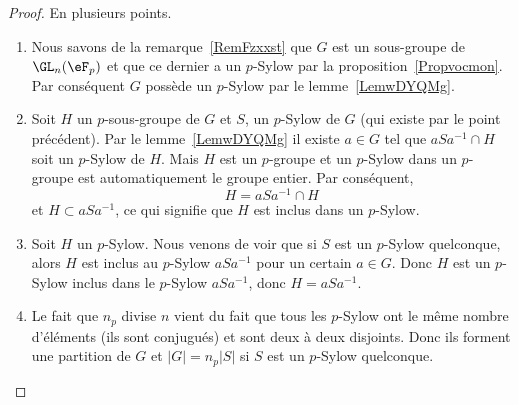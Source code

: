 \begin{proof}
	En plusieurs points.
	\begin{enumerate}
		\item

		      Nous savons de la remarque~\ref{RemFzxxst} que \( G\) est un sous-groupe de \( \GL_n(\eF_p)\) et que ce dernier a un \( p\)-Sylow par la proposition~\ref{Propvocmon}. Par conséquent \( G\) possède un \( p\)-Sylow par le lemme~\ref{LemwDYQMg}.

		\item

		      Soit \( H\) un \( p\)-sous-groupe de \( G\) et \( S\), un \( p\)-Sylow de \( G\) (qui existe par le point précédent). Par le lemme~\ref{LemwDYQMg} il existe \( a\in G\) tel que \( aSa^{-1}\cap H\) soit un \( p\)-Sylow de \( H\). Mais \( H\) est un \(p\)-groupe et un \( p\)-Sylow dans un \( p\)-groupe est automatiquement le groupe entier. Par conséquent,
		      \begin{equation}
			      H=aSa^{-1}\cap H
		      \end{equation}
		      et \( H\subset aSa^{-1}\), ce qui signifie que \( H\) est inclus dans un \( p\)-Sylow.

		\item

		      Soit \( H\) un \( p\)-Sylow. Nous venons de voir que si \( S\) est un \( p\)-Sylow quelconque, alors \( H\) est inclus au \( p\)-Sylow \( aSa^{-1}\) pour un certain \( a\in G\). Donc \( H\) est un \( p\)-Sylow inclus dans le \( p\)-Sylow \( aSa^{-1}\), donc \( H=aSa^{-1}\).

		\item

		      Le fait que \( n_p\) divise \( n\) vient du fait que tous les \( p\)-Sylow ont le même nombre d'éléments (ils sont conjugués) et sont deux à deux disjoints. Donc ils forment une partition de \( G\) et \( | G |=n_p| S |\) si \( S\) est un \( p\)-Sylow quelconque.


\end{enumerate}
\end{proof}
